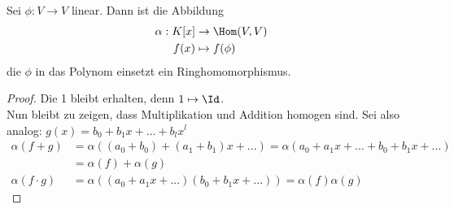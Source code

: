\documentclass{mycourse}
\begin{document}
\begin{lem}
	\label{lem:12.8}
	Sei $\phi:V\to V$ linear.
	Dann ist die Abbildung
	\begin{align*}
		\alpha:K[x] &\to \Hom(V,V)\\
			  f(x) &\mapsto f(\phi)
	\end{align*}
	die $\phi$ in das Polynom einsetzt ein Ringhomomorphismus.
	
	\begin{proof}
		Die 1 bleibt erhalten, denn $ 1 \mapsto \Id$.  \\
		Nun bleibt zu zeigen, dass Multiplikation und Addition homogen sind. Sei also analog: $g(x)=b_0+b_1x+...+b_lx^l$
		\begin{align*}
		\alpha(f+g)&=\alpha((a_0+b_0)+(a_1+b_1)x+...)=\alpha(a_0+a_1x+...+b_0+b_1x+...)\\ &=\alpha(f)+\alpha(g) \\
		\alpha(f\cdot g)&=\alpha((a_0+a_1x+...)(b_0+b_1x+...))=\alpha(f)\alpha(g)
		\end{align*}
		
		
	\end{proof}
\end{lem}
\end{document}
